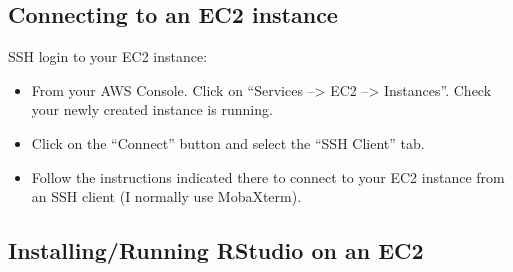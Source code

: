\documentclass[]{book}
\providecommand{\tightlist}{%
  \setlength{\itemsep}{0pt}\setlength{\parskip}{0pt}}
\begin{document}
\subsection{Connecting to an EC2
instance}\label{connecting-to-an-ec2-instance}

SSH login to your EC2 instance:

\begin{itemize}
\tightlist
\item
  From your AWS Console. Click on ``Services --\textgreater{} EC2
  --\textgreater{} Instances''. Check your newly created instance is
  running.
\item
  Click on the ``Connect'' button and select the ``SSH Client'' tab.
\item
  Follow the instructions indicated there to connect to your EC2
  instance from an SSH client (I normally use MobaXterm).
\end{itemize}

\subsection{Installing/Running RStudio on an
EC2}\label{installingrunning-rstudio-on-an-ec2}
\end{document}
